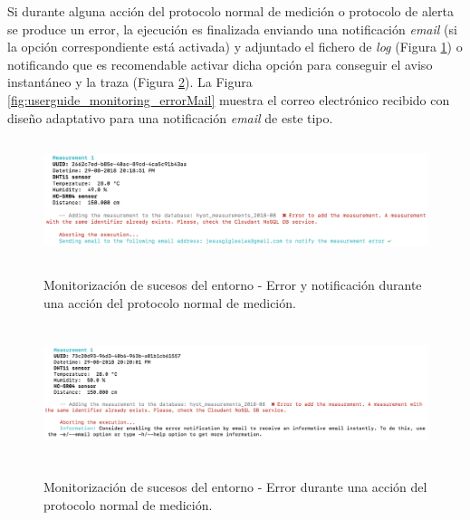 \documentclass[12pt,a4paper, twoside]{report}
\begin{document}
	 Si durante alguna acción del protocolo normal de medición o protocolo de alerta se produce un error, la ejecución es finalizada enviando una notificación \textit{email} (si la opción correspondiente está activada) y adjuntado el fichero de \textit{log} (Figura \ref{fig:userguide_monitoring_errorMeasurementMail}) o notificando que es recomendable activar dicha opción para conseguir el aviso instantáneo y la traza (Figura \ref{fig:userguide_monitoring_errorMeasurement}). La Figura \ref{fig:userguide_monitoring_errorMail} muestra el correo electrónico recibido con diseño adaptativo para una notificación \textit{email} de este tipo.
	 
	 	 	\begin{figure}[!ht]   
				\caption{Monitorización de sucesos del entorno - Error y notificación durante una acción del protocolo normal de medición.} 
				\begin{center} 
					\includegraphics[width=15cm,height=3.5cm]{Images/userGuide/monitoring/errorMeasurementMail} \\
					\label{fig:userguide_monitoring_errorMeasurementMail} 
				\end{center}  
			\end{figure}	 
			
			\begin{figure}[!ht]   
				\caption{Monitorización de sucesos del entorno - Error durante una acción del protocolo normal de medición.} 
				\begin{center} 
					\includegraphics[width=15cm,height=4cm]{Images/userGuide/monitoring/errorMeasurement} \\
					\label{fig:userguide_monitoring_errorMeasurement} 
				\end{center}  
			\end{figure}	 
			
\end{document}
